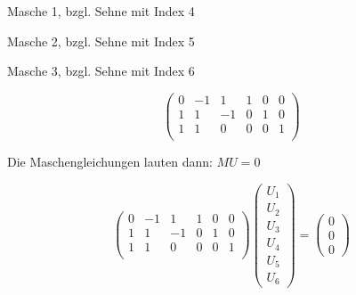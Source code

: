 \documentclass[german]{article}
\begin{document}
	Masche 1, bzgl. Sehne mit Index 4


	Masche 2, bzgl. Sehne mit Index 5


	Masche 3, bzgl. Sehne mit Index 6

	\[
		\begin{pmatrix}
			0 & -1 & 1 & 1 & 0 & 0 \\
			1 & 1 & -1 & 0 & 1 & 0 \\
			1 & 1 & 0 & 0 & 0 & 1 \\
		\end{pmatrix}
	\]

	Die Maschengleichungen lauten dann: $MU = 0$

	\[
		\begin{pmatrix}
			0 & -1 & 1 & 1 & 0 & 0 \\
			1 & 1 & -1 & 0 & 1 & 0 \\
			1 & 1 & 0 & 0 & 0 & 1 \\
		\end{pmatrix}
		\begin{pmatrix}
			U_1 \\
			U_2 \\
			U_3 \\
			U_4 \\
			U_5 \\
			U_6
		\end{pmatrix}
		=
		\begin{pmatrix}
			0 \\
			0 \\
			0
		\end{pmatrix}
	\]
\end{document}
